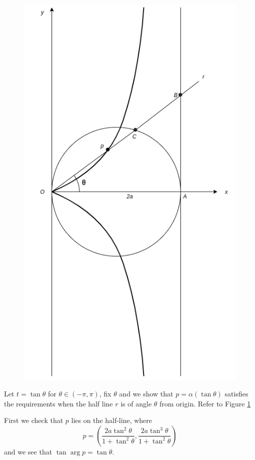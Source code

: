 \documentclass[12pt]{article}
\begin{document}
\begin{figure} \label{Pic}
     \center
     \includegraphics[scale = 0.3]{Untitled Diagram.png}
\end{figure}

Let \(t = \tan\theta\) for \(\theta \in (-\pi,\pi)\), fix \(\theta\) and
we show that \(p = \alpha(\tan\theta)\) satisfies the requirements when
the half line \(r\) is of angle \(\theta\) from origin. Refer to Figure \ref{Pic}

First we check that \(p\) lies on the half-line, where
\[ p = \left( \frac{2a\tan^2\theta}{1+\tan^2\theta}, \frac{2a\tan^3\theta}{1+\tan^2\theta} \right) \]
and we see that \(\tan\arg p = \tan\theta\).
\end{document}
